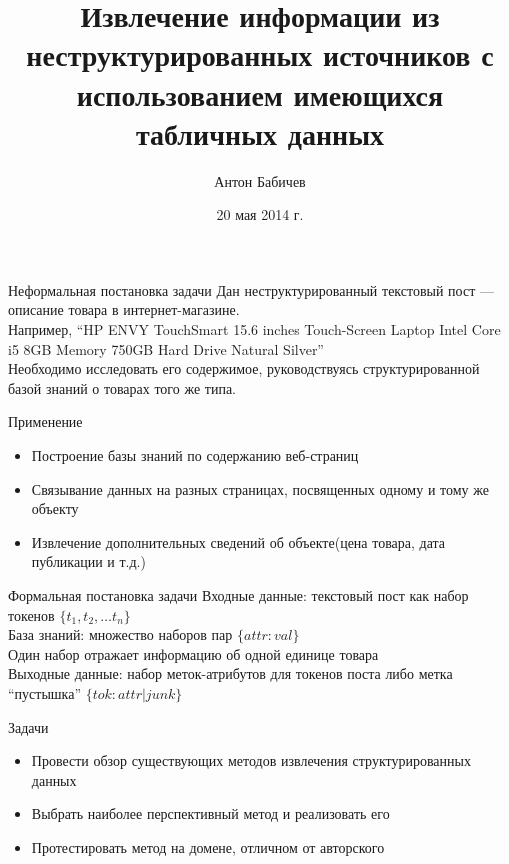 \documentclass[14pt,mathserif,aspectratio=43]{beamer}
\title{Извлечение информации из неструктурированных источников с использованием имеющихся табличных данных \vspace{-1em}}
\author{Антон Бабичев}
\institute{

    Научный руководитель Недумов Ярослав Ростиславович\\
    \medskip
    Факультет ВМК МГУ им. М.В.\,Ломоносова\\
    Кафедра Системного Программирования\\

    \medskip
}
\date{\small{20 мая 2014 г.}}
\begin{document}
\begin{frame}[plain]
    \titlepage
\end{frame}

\begin{frame}{Неформальная постановка задачи}
	Дан неструктурированный текстовый пост --- описание товара в интернет-магазине.\\
	\medskip
	Например, ``HP ENVY TouchSmart 15.6 inches Touch-Screen Laptop Intel Core i5 8GB Memory 750GB Hard Drive Natural Silver''\\
	\medskip
	Необходимо исследовать его содержимое, руководствуясь структурированной базой знаний о товарах того же типа.\\
\end{frame}

\begin{frame}{Применение}
    \begin{itemize}
	    \item Построение базы знаний по содержанию веб-страниц 

	    \item Связывание данных на разных страницах, посвященных одному и тому же объекту

		\item Извлечение дополнительных сведений об объекте(цена товара, дата публикации и т.д.) 
    \end{itemize}
\end{frame}

\begin{frame}{Формальная постановка задачи}
	Входные данные: текстовый пост как набор токенов $\{t_1, t_2, \ldots t_n\}$\\
	База знаний: множество наборов пар $\{attr: val\}$\\
    Один набор отражает информацию об одной единице товара\\
	Выходные данные: набор меток-атрибутов для токенов поста либо метка ``пустышка'' $\{tok: attr | junk\}$\\
\end{frame}

\begin{frame}{Задачи}
    \begin{itemize}
	    \item Провести обзор существующих методов извлечения структурированных данных

	    \item Выбрать наиболее перспективный метод и реализовать его

		\item Протестировать метод на домене, отличном от авторского 
    \end{itemize}
\end{frame}
\end{document}
